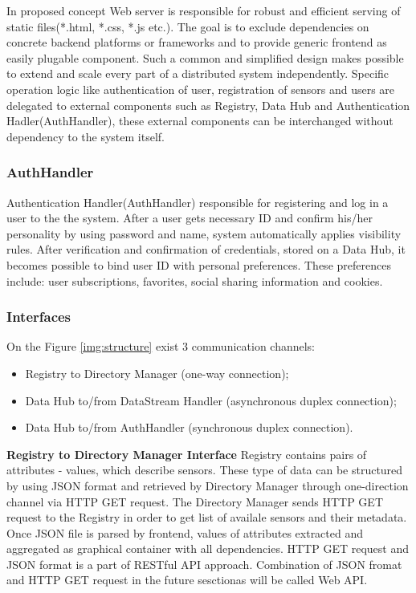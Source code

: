     In proposed concept Web server is responsible for robust and efficient serving of static files(*.html, *.css, *.js etc.). The goal is to exclude dependencies on concrete backend platforms or frameworks and to provide generic frontend as easily plugable component. Such a common and simplified design makes possible to extend and scale every part of a distributed system independently. Specific operation logic like authentication of user, registration of sensors and users are delegated to external components such as Registry, Data Hub and Authentication Hadler(AuthHandler), these external components can be interchanged without dependency to the system itself.

    \subsubsection{AuthHandler}
    Authentication Handler(AuthHandler) responsible for registering and log in a user to the the system. After a user gets necessary ID and confirm his/her personality by using password and name, system automatically applies visibility rules. After verification and confirmation of credentials, stored on a Data Hub, it becomes possible to bind user ID with personal preferences. These preferences include: user subscriptions, favorites, social sharing information and cookies.

    \subsubsection{Interfaces}
      On the Figure \ref{img:structure} exist 3 communication channels: 
      \begin{itemize}
      \item Registry to Directory Manager (one-way connection);
      \item Data Hub to/from DataStream Handler (asynchronous duplex connection);
      \item Data Hub to/from AuthHandler (synchronous duplex connection). 
      \end{itemize}

      \textbf{Registry to Directory Manager Interface}
      \newline
      Registry contains pairs of attributes - values, which describe sensors. These type of data can be structured by using JSON format and retrieved by Directory Manager through one-direction channel via HTTP GET request. The Directory Manager sends HTTP GET request to the Registry in order to get list of availale sensors and their metadata. Once JSON file is parsed by frontend, values of attributes extracted and aggregated as graphical container with all dependencies. HTTP GET request and JSON format is a part of RESTful API approach. Combination of JSON fromat and HTTP GET request in the future sesctionas will be called Web API.

